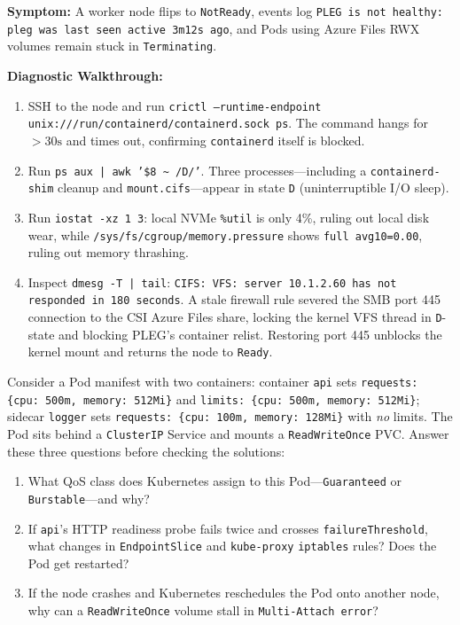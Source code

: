 \begin{realworldbox}
\textbf{Symptom:} A worker node flips to \texttt{NotReady}, events log \texttt{PLEG is not healthy: pleg was last seen active 3m12s ago}, and Pods using Azure Files RWX volumes remain stuck in \texttt{Terminating}.

\textbf{Diagnostic Walkthrough:}
\begin{enumerate}[leftmargin=12pt]
  \item SSH to the node and run \texttt{crictl --runtime-endpoint unix:///run/containerd/containerd.sock ps}. The command hangs for $>30\text{s}$ and times out, confirming \texttt{containerd} itself is blocked.
  \item Run \texttt{ps aux | awk '\$8 \textasciitilde{} /D/'}. Three processes—including a \texttt{containerd-shim} cleanup and \texttt{mount.cifs}—appear in state \texttt{D} (uninterruptible I/O sleep).
  \item Run \texttt{iostat -xz 1 3}: local NVMe \texttt{\%util} is only 4\%, ruling out local disk wear, while \texttt{/sys/fs/cgroup/memory.pressure} shows \texttt{full avg10=0.00}, ruling out memory thrashing.
  \item Inspect \texttt{dmesg -T | tail}: \texttt{CIFS: VFS: server 10.1.2.60 has not responded in 180 seconds}. A stale firewall rule severed the SMB port 445 connection to the CSI Azure Files share, locking the kernel VFS thread in \texttt{D}-state and blocking PLEG's container relist. Restoring port 445 unblocks the kernel mount and returns the node to \texttt{Ready}.
\end{enumerate}
\end{realworldbox}

\begin{tryityourselfbox}
Consider a Pod manifest with two containers: container \texttt{api} sets \texttt{requests: \{cpu: 500m, memory: 512Mi\}} and \texttt{limits: \{cpu: 500m, memory: 512Mi\}}; sidecar \texttt{logger} sets \texttt{requests: \{cpu: 100m, memory: 128Mi\}} with \emph{no} limits. The Pod sits behind a \texttt{ClusterIP} Service and mounts a \texttt{ReadWriteOnce} PVC. Answer these three questions before checking the solutions:
\begin{enumerate}[leftmargin=12pt]
  \item What QoS class does Kubernetes assign to this Pod—\texttt{Guaranteed} or \texttt{Burstable}—and why?
  \item If \texttt{api}'s HTTP readiness probe fails twice and crosses \texttt{failureThreshold}, what changes in \texttt{EndpointSlice} and \texttt{kube-proxy} \texttt{iptables} rules? Does the Pod get restarted?
  \item If the node crashes and Kubernetes reschedules the Pod onto another node, why can a \texttt{ReadWriteOnce} volume stall in \texttt{Multi-Attach error}?
\end{enumerate}
\end{tryityourselfbox}

